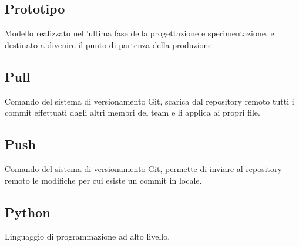 \subsection{Prototipo}
Modello realizzato nell'ultima fase della progettazione e sperimentazione, e destinato a divenire il punto di partenza della produzione.

\subsection{Pull}
Comando del sistema di versionamento Git, scarica dal repository remoto tutti i commit effettuati dagli altri membri del team e li applica ai propri file.

\subsection{Push}
Comando del sistema di versionamento Git, permette di inviare al repository remoto le modifiche per cui esiste un commit in locale.

\subsection{Python}
Linguaggio di programmazione ad alto livello.
